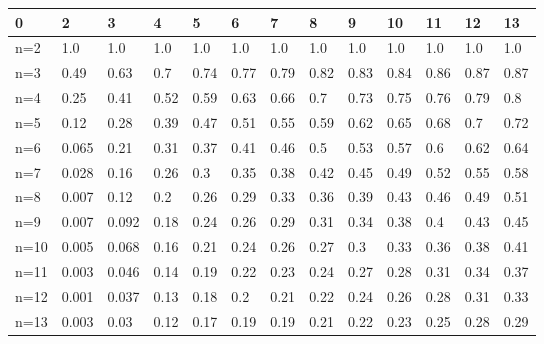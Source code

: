 \begin{tabular}{l|llllllllllll}
\toprule 
0 & 2 & 3 & 4 & 5 & 6 & 7 & 8 & 9 & 10 & 11 & 12 & 13 \\
\hline 
n=2 & 1.0 & 1.0 & 1.0 & 1.0 & 1.0 & 1.0 & 1.0 & 1.0 & 1.0 & 1.0 & 1.0 & 1.0 \\
n=3 & 0.49 & 0.63 & 0.7 & 0.74 & 0.77 & 0.79 & 0.82 & 0.83 & 0.84 & 0.86 & 0.87 & 0.87 \\
n=4 & 0.25 & 0.41 & 0.52 & 0.59 & 0.63 & 0.66 & 0.7 & 0.73 & 0.75 & 0.76 & 0.79 & 0.8 \\
n=5 & 0.12 & 0.28 & 0.39 & 0.47 & 0.51 & 0.55 & 0.59 & 0.62 & 0.65 & 0.68 & 0.7 & 0.72 \\
n=6 & 0.065 & 0.21 & 0.31 & 0.37 & 0.41 & 0.46 & 0.5 & 0.53 & 0.57 & 0.6 & 0.62 & 0.64 \\
n=7 & 0.028 & 0.16 & 0.26 & 0.3 & 0.35 & 0.38 & 0.42 & 0.45 & 0.49 & 0.52 & 0.55 & 0.58 \\
n=8 & 0.007 & 0.12 & 0.2 & 0.26 & 0.29 & 0.33 & 0.36 & 0.39 & 0.43 & 0.46 & 0.49 & 0.51 \\
n=9 & 0.007 & 0.092 & 0.18 & 0.24 & 0.26 & 0.29 & 0.31 & 0.34 & 0.38 & 0.4 & 0.43 & 0.45 \\
n=10 & 0.005 & 0.068 & 0.16 & 0.21 & 0.24 & 0.26 & 0.27 & 0.3 & 0.33 & 0.36 & 0.38 & 0.41 \\
n=11 & 0.003 & 0.046 & 0.14 & 0.19 & 0.22 & 0.23 & 0.24 & 0.27 & 0.28 & 0.31 & 0.34 & 0.37 \\
n=12 & 0.001 & 0.037 & 0.13 & 0.18 & 0.2 & 0.21 & 0.22 & 0.24 & 0.26 & 0.28 & 0.31 & 0.33 \\
n=13 & 0.003 & 0.03 & 0.12 & 0.17 & 0.19 & 0.19 & 0.21 & 0.22 & 0.23 & 0.25 & 0.28 & 0.29 \\
\bottomrule 
\end{tabular}
